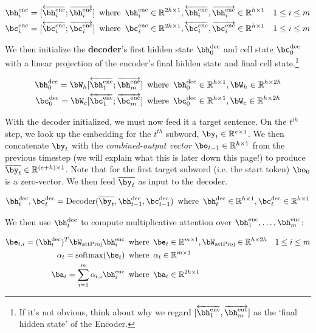 \begin{align}
    \henc_i = [\hencbw{i}; \hencfw{i}] \enspace &\text{where}\enspace \henc_i \in \Real^{2h \times 1}, \hencbw{i}, \hencfw{i} \in \Real^{h \times 1} &1 \le i \le m \\
    \cenc_i = [\cencbw{i}; \cencfw{i}] \enspace &\text{where} \enspace \cenc_i \in \Real^{2h \times 1}, \cencbw{i}, \cencfw{i} \in \Real^{h \times 1} &1 \le i \le m
\end{align}

We then initialize the \textbf{decoder}'s first hidden state $\hdec_0$ and cell state $\cdec_0$ with a linear projection of the encoder's final hidden state and final cell state.\footnote{If it's not obvious, think about why we regard $[\hencbw{1}, \hencfw{m}]$ as the `final hidden state' of the Encoder.} 

\begin{align}
    \hdec_0 = \bW_{h}[\hencbw{1}; \hencfw{m}] \enspace &\text{where} \enspace \hdec_0 \in \Real^{h \times 1}, \bW_{h} \in \Real^{h \times 2h}\\
    \cdec_0 = \bW_{c}[\cencbw{1}; \cencfw{m}] \enspace &\text{where} \enspace \cdec_0 \in \Real^{h \times 1}, \bW_{c} \in \Real^{h \times 2h}
\end{align}

With the decoder initialized, we must now feed it a target sentence. On the $t^{th}$ step, we look up the embedding for the $t^{th}$ subword,  $\by_t \in \Real^{e \times 1}$. We then concatenate $\by_t$ with the \textit{combined-output vector} $\bo_{t-1} \in \Real^{h \times 1}$ from the previous timestep (we will explain what this is later down this page!\@) to produce $\overline{\by_t} \in \Real^{(e+h) \times 1}$. Note that for the first target subword (i.e. the start token) $\bo_{0}$ is a zero-vector. We then feed $\overline{\by_t}$ as input to the decoder. 

\begin{align}
    \hdec_t, \cdec_t = \text{Decoder}(\overline{\by_t}, \hdec_{t-1}, \cdec_{t-1}) \enspace &\text{where} \enspace \hdec_t \in \Real^{h \times 1}, \cdec_t \in \Real^{h \times 1}\\
\end{align}

We then use $\hdec_t$ to compute  multiplicative attention over $\henc_1, \dots, \henc_m$:

\begin{align}
    \be_{t, i} = (\hdec_t)^T\bW_{\text{attProj}}\henc_i \enspace &\text{where} \enspace \be_{t} \in \Real^{m \times 1}, \bW_{\text{attProj}}\in \Real^{h \times 2h} & 1 \le i \le m \\
    \alpha_t= \text{softmax}(\be_t) \enspace &\text{where} \enspace \alpha_t \in \Real^{m \times 1}\\
    \ba_t = \sum_{i=1}^{m}\alpha_{t,i}\henc_i \enspace &\text{where} \enspace \ba_t \in \Real^{2h \times 1}
\end{align}
 
